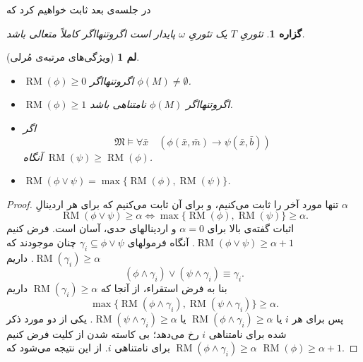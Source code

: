 \documentclass[12pt,a4paper]{report}
\theoremstyle{colorhead}
\newtheorem{prop}[thm]{گزاره}
\newtheorem{lem}[thm]{لم}
\DeclareMathOperator{\RM}{RM}
\begin{document}
در جلسه‌ی بعد ثابت خواهیم کرد که
\begin{prop}
تئوریِ
$T$
یک تئوریِ
$\omega$
پایدار است اگروتنهااگر کاملاً متعالی باشد.
\end{prop}
\begin{lem}[ویژگی‌های مرتبه‌ی مُرلی]
\hfill 
\begin{itemize}
\item 
$\RM(\phi)\geq 0$
اگروتنهااگر
$\phi(M)\not=\emptyset$.
\item 
$\RM(\phi)\geq 1$
اگروتنهااگر
$\phi(M)$
نامتناهی باشد.
\item 
اگر 
\[
\mathfrak{M}\models \forall \bar{x} \quad (\phi(\bar{x},\bar{m})\to
\psi(\bar{x},\bar{b}))
\]
آنگاه 
$\RM(\psi)\geq \RM(\phi)$.
\item 
$\RM(\phi\vee \psi)=\max\{\RM(\phi),\RM(\psi)\}$.
\end{itemize}
\end{lem}
\begin{proof}
تنها مورد آخر را ثابت می‌کنیم، و برای آن ثابت می‌کنیم که برای هر اردینالِ
$\alpha$
\[
\RM(\phi\vee \psi)\geq \alpha\Leftrightarrow \max\{\RM(\phi),\RM(\psi)\}\geq \alpha.
\]
اثبات گفته‌ی بالا برای
$\alpha=0$
و اردینالهای حدی، آسان است. فرض کنیم
$\RM(\phi\vee \psi)\geq \alpha+1$.
آنگاه فرمولهای
$\gamma_i\subseteq \phi\vee \psi$
چنان موجودند که 
$\RM(\gamma_i)\geq \alpha$.
داریم
\[
(\phi\wedge \gamma_i)\vee(\psi\wedge \gamma_i)\equiv \gamma_i.
\]
بنا به فرض استقراء، از آنجا که
$\RM(\gamma_i)\geq \alpha$
داریم
\[
\max\{\RM(\phi\wedge\gamma_i),\RM(\psi\wedge \gamma_i)\}\geq \alpha.
\]
پس برای هر
$i$
یا
$\RM(\phi\wedge \gamma_i)\geq \alpha$
یا
$\RM(\psi\wedge \gamma_i)\geq \alpha$.
یکی از دو مورد ذکر شده 
 برای نامتناهی
$i$
رخ می‌دهد؛ بی کاسته شدن از کلیت فرض کنیم
$\RM(\phi\wedge \gamma_i)\geq \alpha$
برای نامتناهی
$i$.
از این نتیجه می‌شود که
$\RM(\phi)\geq \alpha+1$.
\end{proof}
\pagebreak
\end{document}
